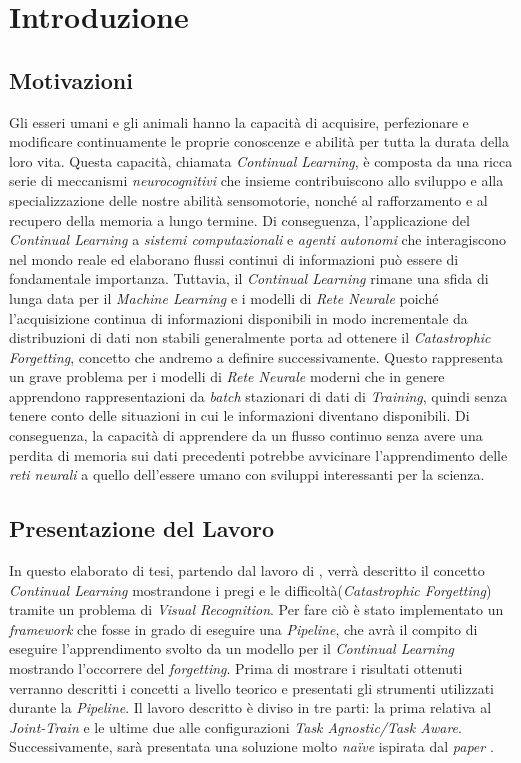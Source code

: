 \chapter{Introduzione}\label{ch:introduzione}
\section*{Motivazioni}
Gli esseri umani e gli animali hanno la capacità di acquisire, perfezionare e modificare continuamente le proprie conoscenze e abilità per tutta la durata della loro vita. Questa capacità, chiamata \textit{Continual Learning}, è composta da una ricca serie di meccanismi \textit{neurocognitivi} che insieme contribuiscono allo sviluppo e alla specializzazione delle nostre abilità sensomotorie, nonché al rafforzamento e al recupero della memoria a lungo termine. Di conseguenza, l'applicazione del \textit{Continual Learning} a  \textit{sistemi computazionali} e \textit{agenti autonomi} che interagiscono nel mondo reale ed elaborano flussi continui di informazioni può essere di  fondamentale importanza. Tuttavia, il \textit{Continual Learning} rimane una sfida di lunga data per il \textit{Machine Learning} e i modelli di \textit{Rete Neurale} poiché l'acquisizione continua di informazioni disponibili in modo incrementale da distribuzioni di dati non stabili generalmente porta ad ottenere il \textit{Catastrophic Forgetting}, concetto che andremo a definire successivamente.\newline
Questo rappresenta un grave problema per i modelli di \textit{Rete Neurale} moderni che in genere apprendono rappresentazioni da \textit{batch} stazionari di dati di \textit{Training}, quindi senza tenere conto delle situazioni in cui le informazioni diventano disponibili. Di conseguenza, la capacità  di apprendere da un flusso continuo  senza avere una perdita di memoria sui dati precedenti potrebbe avvicinare l'apprendimento delle \textit{reti neurali} a quello dell'essere umano con sviluppi interessanti per la scienza.
\section*{Presentazione del Lavoro}
In questo elaborato di tesi, partendo dal lavoro di \cite{Continual_Learning}, verrà descritto il concetto \textit{Continual Learning} mostrandone i pregi e le difficoltà(\textit{Catastrophic Forgetting}) tramite un problema di \textit{Visual Recognition}. Per fare ciò è stato implementato un \textit{framework} che fosse in grado di eseguire una \textit{Pipeline}, che avrà il compito di eseguire l'apprendimento svolto da un modello per il \textit{Continual Learning} mostrando l'occorrere del \textit{forgetting}. Prima di mostrare i risultati ottenuti verranno descritti i concetti a livello teorico e presentati gli strumenti utilizzati durante la \textit{Pipeline}.\newline
Il lavoro descritto è diviso in tre parti: la prima relativa al \textit{Joint-Train} e le ultime due alle configurazioni \textit{Task Agnostic/Task Aware}. Successivamente, sarà presentata una soluzione molto \textit{naïve} ispirata dal \textit{paper} \cite{Continual_Learning}.
